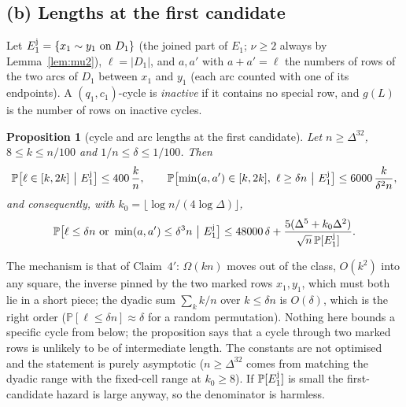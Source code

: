 \documentclass[11pt]{article}
\newtheorem{proposition}[theorem]{Proposition}
\theoremstyle{definition}
\renewcommand{\Pr}{\mathbb{P}}
\begin{document}
\subsection*{(b) Lengths at the first candidate}

Let $E_1^{\rm j}=\{x_1\sim y_1\text{ on }D_1\}$ (the joined part of $E_1$; $\nu\ge2$
always by Lemma~\ref{lem:mu2}), $\ell=|D_1|$, and $a,a'$ with $a+a'=\ell$ the numbers of
rows of the two arcs of $D_1$ between $x_1$ and $y_1$ (each arc counted with one of its
endpoints).  A $(q_1,c_1)$-cycle is \emph{inactive} if it contains no special row, and
$g(L)$ is the number of rows on inactive cycles.

\begin{proposition}[cycle and arc lengths at the first candidate]\label{prop:lengths}
Let $n\ge\Delta^{32}$, $8\le k\le n/100$ and $1/n\le\delta\le1/100$.  Then
\[
\Pr\bigl[\ell\in[k,2k]\ \big|\ E_1^{\rm j}\bigr]\le400\,\frac kn,
\qquad
\Pr\bigl[\min(a,a')\in[k,2k],\ \ell\ge\delta n\ \big|\ E_1^{\rm j}\bigr]\le6000\,\frac{k}{\delta^2n},
\]
and consequently, with $k_0=\lfloor\log n/(4\log\Delta)\rfloor$,
\[
\Pr\bigl[\ell\le\delta n\text{ or }\min(a,a')\le\delta^3n\ \big|\ E_1^{\rm j}\bigr]
\le48000\,\delta+\frac{5(\Delta^5+k_0\Delta^2)}{\sqrt n\,\Pr[E_1^{\rm j}]}.
\]
\end{proposition}

The mechanism is that of Claim~$4'$: $\Omega(kn)$ moves out of the class, $O(k^2)$ into
any square, the inverse pinned by the two marked rows $x_1,y_1$, which must both lie in a
short piece; the dyadic sum $\sum_kk/n$ over $k\le\delta n$ is $O(\delta)$, which is the
right order ($\Pr[\ell\le\delta n]\approx\delta$ for a random permutation).  Nothing here
bounds a specific cycle from below; the proposition says that a cycle through two marked
rows is unlikely to be of intermediate length.  The constants are not optimised and the
statement is purely asymptotic ($n\ge\Delta^{32}$ comes from matching the dyadic range with
the fixed-cell range at $k_0\ge8$).  If $\Pr[E_1^{\rm j}]$ is small the first-candidate
hazard is large anyway, so the denominator is harmless.
\end{document}
